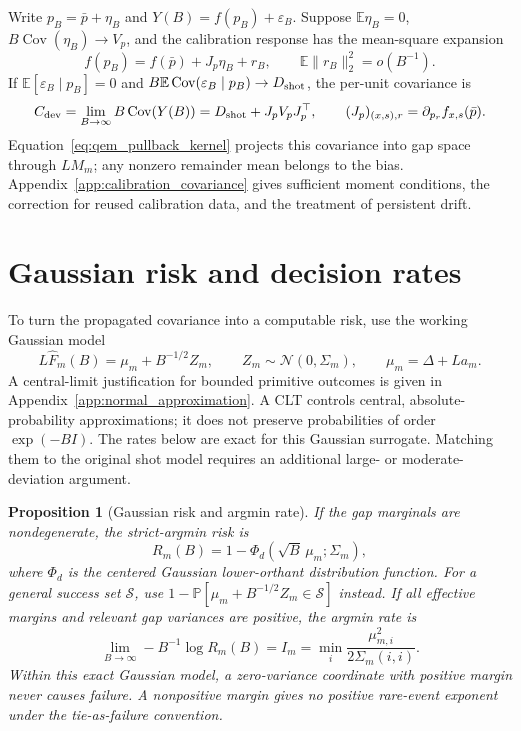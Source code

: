 \documentclass[a4paper,onecolumn,unpublished,nopdfoutputerror]{quantumarticle}
\theoremstyle{plain}
\newtheorem{proposition}[theorem]{Proposition}
\theoremstyle{definition}
\newcommand{\E}{\mathbb{E}}
\newcommand{\Prob}{\mathbb{P}}
\newcommand{\Cov}{\operatorname{Cov}}
\newcommand{\calS}{\mathcal{S}}
\newcommand{\calN}{\mathcal{N}}
\newcommand{\1}{\mathbf{1}}
\begin{document}
Write $p_B=\bar p+\eta_B$ and $Y(B)=f(p_B)+\varepsilon_B$. Suppose $\E\eta_B=0$, $B\Cov(\eta_B)\to V_p$, and the calibration response has the mean-square expansion
\[
f(p_B)=f(\bar p)+J_p\eta_B+r_B,
\qquad \E\|r_B\|_2^2=o(B^{-1}).
\]
If $\E[\varepsilon_B\mid p_B]=0$ and $B\E\Cov(\varepsilon_B\mid p_B)\to D_{\rm shot}$, the per-unit covariance is
\begin{equation}\label{eq:cdev_physical_delta}
C_{\rm dev}=\lim_{B\to\infty}B\Cov(Y(B))
=D_{\rm shot}+J_pV_pJ_p^\top,
\qquad (J_p)_{(x,s),r}=\partial_{p_r}f_{x,s}(\bar p).
\end{equation}
Equation~\eqref{eq:qem_pullback_kernel} projects this covariance into gap space through $LM_m$; any nonzero remainder mean belongs to the bias. Appendix~\ref{app:calibration_covariance} gives sufficient moment conditions, the correction for reused calibration data, and the treatment of persistent drift.

\section{Gaussian risk and decision rates}
\label{sec:gaussian_risk}

To turn the propagated covariance into a computable risk, use the working Gaussian model
\[
L\widehat F_m(B)=\mu_m+B^{-1/2}Z_m,\qquad
Z_m\sim\calN(0,\Sigma_m),\qquad \mu_m=\Delta+La_m.
\]
A central-limit justification for bounded primitive outcomes is given in Appendix~\ref{app:normal_approximation}. A CLT controls central, absolute-probability approximations; it does not preserve probabilities of order $\exp(-BI)$. The rates below are exact for this Gaussian surrogate. Matching them to the original shot model requires an additional large- or moderate-deviation argument.

\begin{proposition}[Gaussian risk and argmin rate]
\label{prop:gaussian_risk}\label{thm:decision_exponent}
If the gap marginals are nondegenerate, the strict-argmin risk is
\begin{equation}\label{eq:gaussian_risk}
R_m(B)=1-\Phi_d(\sqrt B\,\mu_m;\Sigma_m),
\end{equation}
where $\Phi_d$ is the centered Gaussian lower-orthant distribution function. For a general success set $\calS$, use $1-\Prob[\mu_m+B^{-1/2}Z_m\in\calS]$ instead.
If all effective margins and relevant gap variances are positive, the argmin rate is
\begin{equation}\label{eq:argmin_exponent}
\lim_{B\to\infty}-B^{-1}\log R_m(B)
=I_m=\min_i\frac{\mu_{m,i}^2}{2\Sigma_m(i,i)}.
\end{equation}
Within this exact Gaussian model, a zero-variance coordinate with positive margin never causes failure. A nonpositive margin gives no positive rare-event exponent under the tie-as-failure convention.
\end{proposition}
\end{document}

